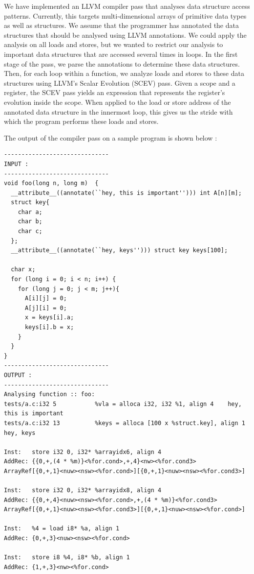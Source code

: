 \documentclass[letterpaper]{article}
\begin{document}
We have implemented an LLVM compiler pass that analyses data structure access patterns.
Currently, this targets multi-dimensional arrays of primitive data types as well as structures.
We assume that the programmer has annotated the data structures that should be
analysed using LLVM annotations.
We could apply the analysis on all loads and stores, but we wanted to restrict our
analysis to important data structures that are accessed several times in loops.
In the first stage of the pass, we parse the annotations to determine these data structures.
Then, for each loop within a function, we analyze loads and stores to these
data structures using LLVM's Scalar Evolution (SCEV) pass. Given a scope and a
register, the SCEV pass yields an expression that represents the register's
evolution inside the scope. When applied to the load or store address of the
annotated data structure in the innermost loop, this gives us the stride
with which the program performs these loads and stores.

The output of the compiler pass on a sample program is shown below :

\begin{Verbatim}[fontsize=\small]
------------------------------
INPUT :
------------------------------
void foo(long n, long m)  {
  __attribute__((annotate(``hey, this is important''))) int A[n][m];
  struct key{
    char a;
    char b;
    char c;
  };
  __attribute__((annotate(``hey, keys''))) struct key keys[100];

  char x;
  for (long i = 0; i < n; i++) {
    for (long j = 0; j < m; j++){
      A[i][j] = 0;
      A[j][i] = 0;
      x = keys[i].a;
      keys[i].b = x;
    }
  }
}
------------------------------
OUTPUT :
------------------------------
Analysing function :: foo:
tests/a.c:i32 5           %vla = alloca i32, i32 %1, align 4    hey, this is important
tests/a.c:i32 13          %keys = alloca [100 x %struct.key], align 1   hey, keys

Inst:   store i32 0, i32* %arrayidx6, align 4
AddRec: {{0,+,(4 * %m)}<%for.cond>,+,4}<nw><%for.cond3>
ArrayRef[{0,+,1}<nuw><nsw><%for.cond>][{0,+,1}<nuw><nsw><%for.cond3>]

Inst:   store i32 0, i32* %arrayidx8, align 4
AddRec: {{0,+,4}<nuw><nsw><%for.cond>,+,(4 * %m)}<%for.cond3>
ArrayRef[{0,+,1}<nuw><nsw><%for.cond3>][{0,+,1}<nuw><nsw><%for.cond>]

Inst:   %4 = load i8* %a, align 1
AddRec: {0,+,3}<nuw><nsw><%for.cond>

Inst:   store i8 %4, i8* %b, align 1
AddRec: {1,+,3}<nw><%for.cond>
\end{Verbatim}
\end{document}
